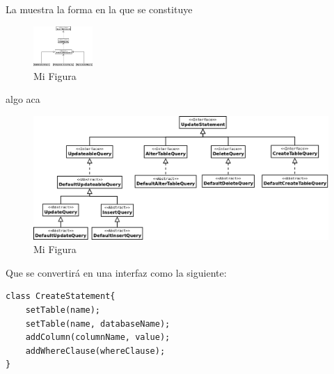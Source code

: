 La  muestra la forma en la que se constituye 

\begin{figure}
  \centering
    \includegraphics[width=0.2\textwidth]{figuras/crossdb-query.png}
  \caption{Mi Figura}
  \label{fig:query}
\end{figure}
algo aca
\begin{figure}
  \centering
    \includegraphics[width=\textwidth]{figuras/crossdb-update.png}
  \caption{Mi Figura}
  \label{fig:update}
\end{figure}

Que se convertirá en una interfaz como la siguiente:


\begin{lstlisting}[title=Pseudocódigo interfaz para CREATE]
class CreateStatement{
	setTable(name);
	setTable(name, databaseName);
	addColumn(columnName, value);
	addWhereClause(whereClause);
}
\end{lstlisting}
